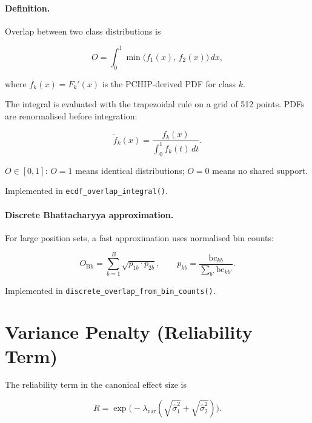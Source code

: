 \documentclass[11pt]{article}
\begin{document}
\paragraph{Definition.}  Overlap between two class distributions is

\begin{equation}
  O = \int_0^1 \min\!\bigl(f_1(x),\,f_2(x)\bigr)\,dx,
  \label{eq:overlap}
\end{equation}

where \(f_k(x) = F_k'(x)\) is the PCHIP-derived PDF for class $k$.

The integral is evaluated with the trapezoidal rule on a grid of 512 points.
PDFs are renormalised before integration:

\begin{equation}
  \tilde{f}_k(x) = \frac{f_k(x)}{\displaystyle\int_0^1 f_k(t)\,dt}.
\end{equation}

\(O \in [0,1]\): \(O=1\) means identical distributions; \(O=0\) means no
shared support.

Implemented in \texttt{ecdf\_overlap\_integral()}.

\paragraph{Discrete Bhattacharyya approximation.}

For large position sets, a fast approximation uses normalised bin counts:

\begin{equation}
  O_\mathrm{Bh} = \sum_{b=1}^{B} \sqrt{p_{1b}\cdot p_{2b}},
  \qquad p_{kb} = \frac{\mathrm{bc}_{kb}}{\sum_{b'}\mathrm{bc}_{kb'}}.
\end{equation}

Implemented in \texttt{discrete\_overlap\_from\_bin\_counts()}.

\section{Variance Penalty (Reliability Term)}

The reliability term in the canonical effect size is

\begin{equation}
  R = \exp\!\bigl(-\lambda_\mathrm{var}
            (\sqrt{\hat\sigma_1^2} + \sqrt{\hat\sigma_2^2})\bigr).
  \label{eq:reliability}
\end{equation}
\end{document}
